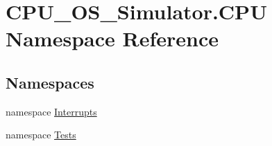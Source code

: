 \hypertarget{namespace_c_p_u___o_s___simulator_1_1_c_p_u}{}\section{C\+P\+U\+\_\+\+O\+S\+\_\+\+Simulator.\+C\+P\+U Namespace Reference}
\label{namespace_c_p_u___o_s___simulator_1_1_c_p_u}
\subsection*{Namespaces}
\begin{DoxyCompactItemize}
\item 
namespace \hyperlink{namespace_c_p_u___o_s___simulator_1_1_c_p_u_1_1_interrupts}{Interrupts}
\item 
namespace \hyperlink{namespace_c_p_u___o_s___simulator_1_1_c_p_u_1_1_tests}{Tests}
\end{DoxyCompactItemize}
